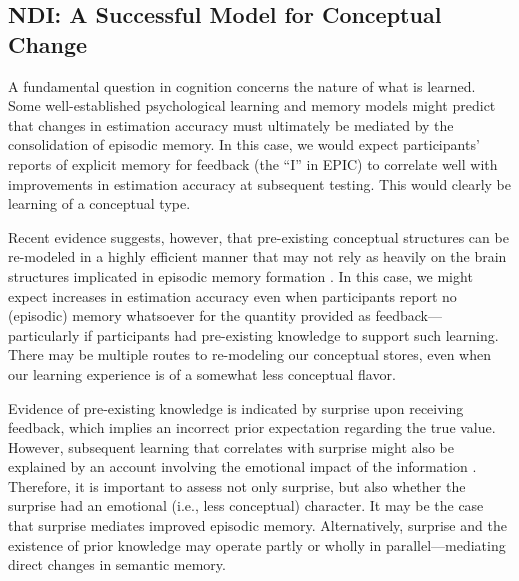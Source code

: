 
\subsection{NDI: A Successful Model for Conceptual Change}


A fundamental question in cognition concerns the nature of what is learned. Some
well-established psychological learning and memory models
\parencite[e.g.,][]{nadel_memory_1997} might predict that changes in estimation accuracy must
ultimately be mediated by the consolidation of episodic memory. In this case, we
would expect participants' reports of explicit memory for feedback (the ``I'' in
EPIC) to correlate well with improvements in estimation accuracy at subsequent
testing.  This would clearly be learning of a conceptual type.

Recent evidence suggests, however, that pre-existing conceptual structures can
be re-modeled in a highly efficient manner that may not rely as heavily on the
brain structures implicated in episodic memory formation
\parencite{tse_schemas_2007,clark_assembling_2003}. In this case, we might
expect increases in estimation accuracy even when participants report no
(episodic) memory whatsoever for the quantity provided as
feedback---particularly if participants had pre-existing knowledge to support
such learning. There may be multiple routes to re-modeling our conceptual
stores, even when our learning experience is of a somewhat less conceptual
flavor.

Evidence of pre-existing knowledge is indicated by surprise upon receiving
feedback, which implies an incorrect prior expectation regarding the true value.
However, subsequent learning that correlates with surprise might also be
explained by an account involving the emotional impact of the information
\parencite{munnich_surprise_2007,thagard_hot_2006}.  Therefore, it is important to
assess not only surprise, but also whether the surprise had an emotional (i.e.,
less conceptual) character. It may be the case that surprise mediates improved
episodic memory. Alternatively, surprise and the existence of prior knowledge
may operate partly or wholly in parallel---mediating direct changes in semantic
memory.

